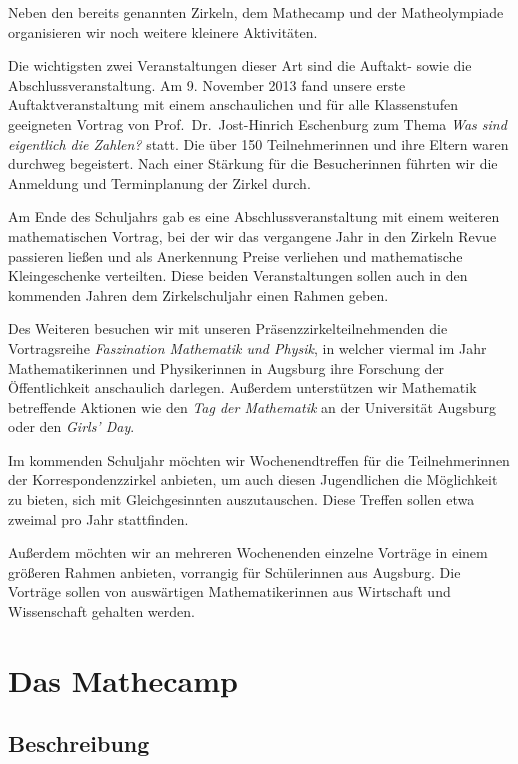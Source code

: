 \documentclass[12pt]{zettel}
\newcommand{\twopics}[2]{%
  \begin{figure}[b]
    \makebox[\textwidth][c]{%
      \texttt{[image: impressionen/\#1]}%
      \hspace*{1cm}%
      \texttt{[image: impressionen/\#2]}%
    }
  \end{figure}
}
\begin{document}
Neben den bereits genannten Zirkeln, dem Mathecamp und der
Matheolympiade organisieren wir noch weitere kleinere
Aktivitäten.

Die wichtigsten zwei Veranstaltungen dieser Art sind die Auftakt- sowie die
Abschlussveranstaltung. Am 9. November 2013 fand unsere erste
Auftaktveranstaltung mit einem anschaulichen und für alle Klassenstufen
geeigneten Vortrag von
Prof.~Dr.~Jost-Hinrich Eschenburg zum Thema \emph{Was sind eigentlich die
Zahlen?} statt.
Die über 150 Teilnehmerinnen und ihre Eltern waren durchweg
begeistert. Nach einer Stärkung für die Besucherinnen führten wir
die Anmeldung und Terminplanung der Zirkel durch.

Am Ende des Schuljahrs gab es eine Abschlussveranstaltung mit einem
weiteren mathematischen Vortrag, bei der wir
das vergangene Jahr in den Zirkeln Revue passieren ließen und als Anerkennung
Preise verliehen und mathematische Kleingeschenke verteilten. Diese beiden Veranstaltungen sollen
auch in den kommenden Jahren dem Zirkelschuljahr einen Rahmen geben.

Des Weiteren besuchen wir mit unseren Präsenzzirkelteilnehmenden die
Vortragsreihe \emph{Faszination Mathematik und Physik}, in welcher viermal im
Jahr Mathematikerinnen und Physikerinnen in Augsburg ihre Forschung der
Öffentlichkeit anschaulich darlegen. Außerdem unterstützen wir
Mathematik betreffende Aktionen wie den \emph{Tag der Mathematik} an
der Universität Augsburg oder den \emph{Girls' Day}.

Im kommenden Schuljahr möchten wir Wochenendtreffen für die Teilnehmerinnen der Korrespondenzzirkel anbieten, um auch diesen Jugendlichen die
Möglichkeit zu bieten, sich mit Gleichgesinnten auszutauschen. Diese Treffen
sollen etwa zweimal pro Jahr stattfinden.

Außerdem möchten wir an mehreren Wochenenden einzelne Vorträge in einem
größeren Rahmen anbieten, vorrangig für Schülerinnen aus Augsburg.
Die Vorträge sollen von auswärtigen Mathematikerinnen aus Wirtschaft und Wissenschaft gehalten werden.


\section{Das Mathecamp}

\subsection{Beschreibung}

\twopics{klein-04}{klein-05}
\end{document}

